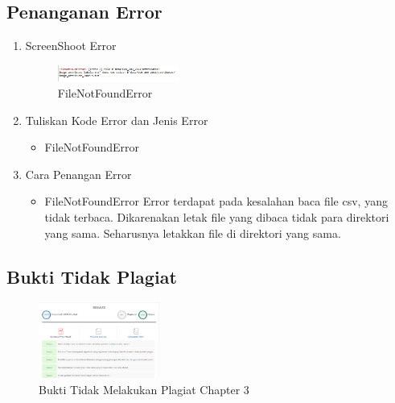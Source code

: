 \subsection{Penanganan Error}
\begin{enumerate}
	\item ScreenShoot Error
	\begin{figure}[H]
		\includegraphics[width=4cm]{figures/1174096/tugas3/error.PNG}
		\centering
		\caption{FileNotFoundError}
	\end{figure}
	\item Tuliskan Kode Error dan Jenis Error
	\begin{itemize}
		\item FileNotFoundError
	\end{itemize}
	\item Cara Penangan Error
	\begin{itemize}
		\item FileNotFoundError
		\hfill\break
		Error terdapat pada kesalahan baca file csv, yang tidak terbaca. Dikarenakan letak file yang dibaca tidak para direktori yang sama. Seharusnya letakkan file di direktori yang sama. 
	\end{itemize}
\end{enumerate}
\subsection{Bukti Tidak Plagiat}
\begin{figure}[H]
\centering
	\includegraphics[width=4cm]{figures/1174096/tugas3/plagiarisme.PNG}
	\caption{Bukti Tidak Melakukan Plagiat Chapter 3}
\end{figure}

